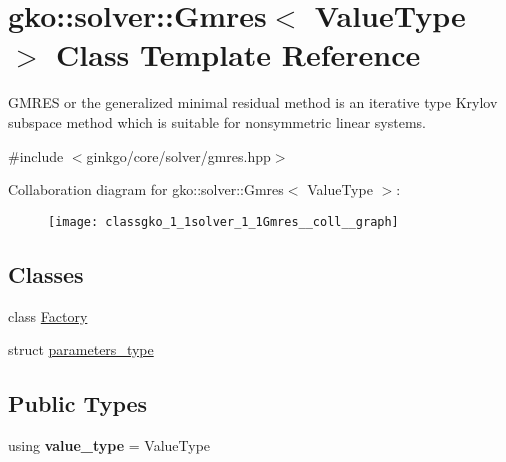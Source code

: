 \hypertarget{classgko_1_1solver_1_1Gmres}{}\section{gko\+:\+:solver\+:\+:Gmres$<$ Value\+Type $>$ Class Template Reference}
\label{classgko_1_1solver_1_1Gmres}


G\+M\+R\+ES or the generalized minimal residual method is an iterative type Krylov subspace method which is suitable for nonsymmetric linear systems.  




{\ttfamily \#include $<$ginkgo/core/solver/gmres.\+hpp$>$}



Collaboration diagram for gko\+:\+:solver\+:\+:Gmres$<$ Value\+Type $>$\+:
\nopagebreak
\begin{figure}[H]
\begin{center}
\leavevmode
\texttt{[image: classgko\_1\_1solver\_1\_1Gmres\_\_coll\_\_graph]}
\end{center}
\end{figure}
\subsection*{Classes}
\begin{DoxyCompactItemize}
\item 
class \hyperlink{classgko_1_1solver_1_1Gmres_1_1Factory}{Factory}
\item 
struct \hyperlink{structgko_1_1solver_1_1Gmres_1_1parameters__type}{parameters\+\_\+type}
\end{DoxyCompactItemize}
\subsection*{Public Types}
\begin{DoxyCompactItemize}
\item 
\mbox{\label{classgko_1_1solver_1_1Gmres_a0df4f52a85e853e0e09ab5e6a83cdf66}} 
using {\bfseries value\+\_\+type} = Value\+Type
\end{DoxyCompactItemize}
